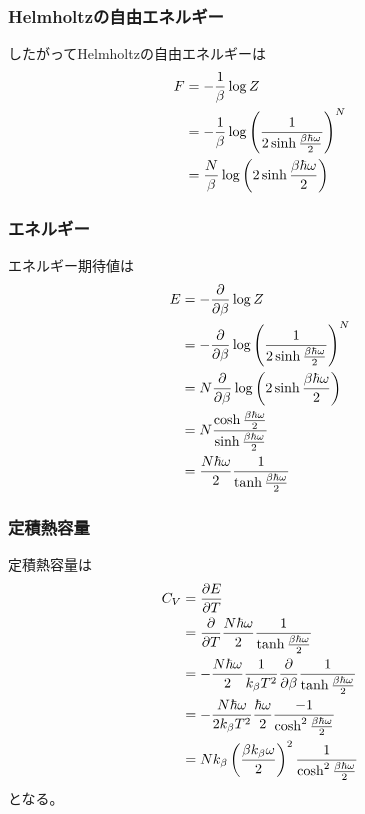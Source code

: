 \documentclass{jsarticle}  %
\numberwithin{equation}{section} %
\numberwithin{figure}{section}
\begin{document}
\subsubsection{Helmholtzの自由エネルギー}
    したがってHelmholtzの自由エネルギーは
    \begin{align}
        F &= -\frac{1}{\beta} \log Z \notag \\
        &= -\frac{1}{\beta} \log \left( \frac{1}{2\sinh \frac{\beta \hbar \omega}{2}} \right)^N \notag \\
        &= \frac{N}{\beta} \log \left( 2\sinh \frac{\beta \hbar \omega}{2} \right) 
    \end{align}
\subsubsection{エネルギー}
    エネルギー期待値は
    \begin{align}
        E &= - \frac{\partial }{\partial \beta} \log Z \notag \\
        &= - \frac{\partial }{\partial \beta} \log \left( \frac{1}{2\sinh \frac{\beta \hbar \omega}{2}} \right)^N \notag \\
        &= N \frac{\partial }{\partial \beta} \log \left( 2\sinh \frac{\beta \hbar \omega}{2} \right) \notag \\
        &= N \frac{\cosh \frac{\beta \hbar \omega}{2}}{\sinh \frac{\beta \hbar \omega}{2}} \notag \\
        &= \frac{N\hbar \omega}{2} \frac{1}{\tanh \frac{\beta \hbar \omega }{2}}
    \end{align}
\subsubsection{定積熱容量}
    定積熱容量は
    \begin{align}
        C_V &= \frac{\partial E}{\partial T} \notag \\
        &= \frac{\partial}{\partial T} \frac{N\hbar \omega}{2} \frac{1}{\tanh \frac{\beta \hbar \omega }{2}} \notag \\
        &= -\frac{N\hbar \omega}{2} \frac{1}{k_\beta T^2}\frac{\partial}{\partial \beta} \frac{1}{\tanh \frac{\beta \hbar \omega }{2}} \notag \\
        &= -\frac{N\hbar \omega}{2k_\beta T^2} \frac{\hbar \omega}{2} \frac{-1}{\cosh^2 \frac{\beta \hbar \omega }{2}} \notag \\
        &= Nk_\beta  \left( \frac{\beta k_\beta \omega}{2} \right)^2 \frac{1}{\cosh^2 \frac{\beta \hbar \omega }{2}}
    \end{align}
    となる。
\end{document}
